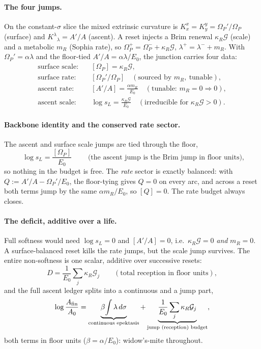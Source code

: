 \documentclass[11pt,a4paper]{article}
\theoremstyle{plain}
\theoremstyle{definition}
\theoremstyle{remark}
\begin{document}
\paragraph{The four jumps.} On the constant-$\sigma$ slice the mixed extrinsic curvature is
$K^x_x=K^y_y=\Omega_P'/\Omega_P$ (surface) and $K^\lambda{}_\lambda=A'/A$ (ascent). A reset injects a
Brim renewal $\kappa_R\mathcal G$ (scale) and a metabolic $m_R$ (Sophia rate), so $\Omega_P^+=\Omega_P^-+\kappa_R\mathcal G$,
$\lambda^+=\lambda^-+m_R$. With $\Omega_P'=\alpha\lambda$ and the floor-tied $A'/A=\alpha\lambda/E_0$,
the junction carries four data:
\begin{align}
\text{surface scale:}\quad &[\Omega_P]=\kappa_R\mathcal G,\\
\text{surface rate:}\quad &[\Omega_P'/\Omega_P]\quad(\text{sourced by }m_R,\ \text{tunable}),\\
\text{ascent rate:}\quad &[A'/A]=\frac{\alpha m_R}{E_0}\quad(\text{tunable: }m_R{=}0\Rightarrow0),\\
\text{ascent scale:}\quad &\log s_L=\frac{\kappa_R\mathcal G}{E_0}\quad(\text{irreducible for }\kappa_R\mathcal G>0).
\end{align}

\paragraph{Backbone identity and the conserved rate sector.} The ascent and surface scale jumps are
tied through the floor,
\begin{equation}
\boxed{\;\log s_L=\frac{[\Omega_P]}{E_0}\;}\qquad\text{(the ascent jump is the Brim jump in floor units),}
\end{equation}
so nothing in the budget is free. The \emph{rate} sector is exactly balanced: with
$Q:=A'/A-\Omega_P'/E_0$, the floor-tying gives $Q=0$ on every arc, and across a reset both terms jump
by the same $\alpha m_R/E_0$, so $[Q]=0$. The rate budget always closes.

\paragraph{The deficit, additive over a life.} Full softness would need $\log s_L=0$ and $[A'/A]=0$,
i.e.\ $\kappa_R\mathcal G=0$ \emph{and} $m_R=0$. A surface-balanced reset kills the rate jumps, but the
scale jump survives. The entire non-softness is one scalar, additive over successive resets:
\begin{equation}
D=\frac1{E_0}\sum_j\kappa_R\mathcal G_j\qquad(\text{total reception in floor units}),
\end{equation}
and the full ascent ledger splits into a continuous and a jump part,
\begin{equation}
\log\frac{A_{\rm fin}}{A_0}=\underbrace{\beta\!\int\lambda\,d\sigma}_{\text{continuous epektasis}}
+\underbrace{\frac1{E_0}\sum_j\kappa_R\mathcal G_j}_{\text{jump (reception) budget}},
\end{equation}
both terms in floor units ($\beta=\alpha/E_0$): widow's-mite throughout.
\end{document}
